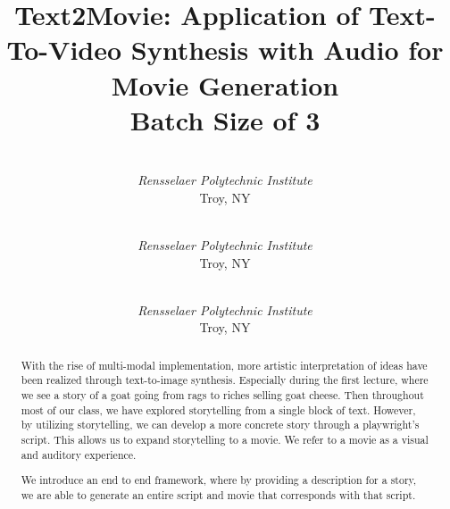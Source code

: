 \documentclass[conference]{IEEEtran}
\begin{document}
\title{Text2Movie: Application of Text-To-Video Synthesis with Audio for Movie Generation \\
{\footnotesize Batch Size of 3}
}

\author{\\
\textit{Rensselaer Polytechnic Institute}\\
Troy, NY
\and
{}\\
\textit{Rensselaer Polytechnic Institute}\\
Troy, NY
\and
{}\\
\textit{Rensselaer Polytechnic Institute}\\
Troy, NY
}

\maketitle

\begin{abstract}

With the rise of multi-modal implementation, more artistic interpretation of ideas have been realized through text-to-image synthesis. Especially during the first lecture, where we see a story of a goat going from rags to riches selling goat cheese. Then throughout most of our class, we have explored storytelling from a single block of text. However, by utilizing storytelling, we can develop a more concrete story through a playwright's script. This allows us to expand storytelling to a movie. We refer to a movie as a visual and auditory experience. 

We introduce an end to end framework, where by providing a description for a story, we are able to generate an entire script and movie that corresponds with that script. 








\end{abstract}
\end{document}
